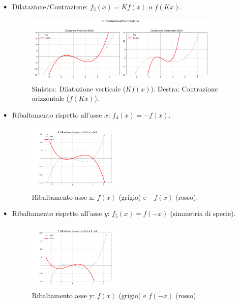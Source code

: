 \documentclass[oneside,10pt]{book} %
\begin{document}
\begin{itemize}
\item Dilatazione/Contrazione: $f_3(x) = K f(x)$ o $f(K x)$.
    \begin{figure}[H]
    \centering
    \includegraphics[width=0.9\textwidth]{img/dilatazione.png}
    \caption{Sinistra: Dilatazione verticale ($K f(x)$). Destra: Contrazione orizzontale ($f(K x)$).}
  \end{figure}

\item Ribaltamento rispetto all'asse $x$: $f_4(x) = -f(x)$.
    \begin{figure}[H]
    \centering
    \includegraphics[width=0.45\textwidth]{img/ribaltamento_x.png}
    \caption{Ribaltamento asse x: $f(x)$ (grigio) e $-f(x)$ (rosso).}
  \end{figure}

\item Ribaltamento rispetto all'asse $y$: $f_5(x) = f(-x)$ (simmetria di specie).
    \begin{figure}[H]
    \centering
    \includegraphics[width=0.45\textwidth]{img/ribaltamento_y.png}
    \caption{Ribaltamento asse y: $f(x)$ (grigio) e $f(-x)$ (rosso).}
  \end{figure}


\end{itemize}
\end{document}
